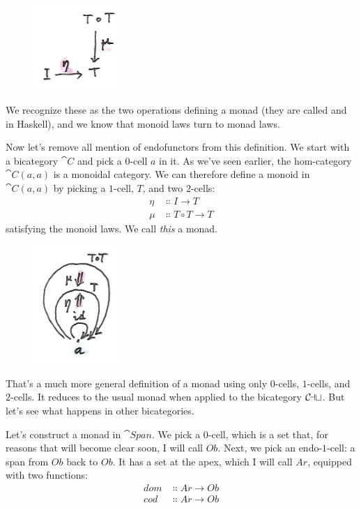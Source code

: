 \begin{figure}[H]
\centering
\includegraphics[width=0.3\textwidth]{images/monad.png}
\end{figure}

\noindent
We recognize these as the two operations defining a monad (they are
called  and  in Haskell), and we know that
monoid laws turn to monad laws.

Now let's remove all mention of endofunctors from this definition. We
start with a bicategory $\cat{C}$ and pick a $0$-cell $a$ in it.
As we've seen earlier, the hom-category $\cat{C}(a, a)$ is a monoidal
category. We can therefore define a monoid in $\cat{C}(a, a)$ by
picking a $1$-cell, $T$, and two $2$-cells:
\begin{align*}
\eta &\Colon I \to T \\
\mu &\Colon T \circ T \to T
\end{align*}
satisfying the monoid laws. We call \emph{this} a monad.

\begin{figure}[H]
\centering
\includegraphics[width=0.3\textwidth]{images/bimonad.png}
\end{figure}

\noindent
That's a much more general definition of a monad using only $0$-cells,
$1$-cells, and $2$-cells. It reduces to the usual monad when applied to the
bicategory $\mathcal{C\mkern-3mu at}$. But let's see what happens in other
bicategories.

Let's construct a monad in $\cat{Span}$. We pick a $0$-cell, which is a
set that, for reasons that will become clear soon, I will call
$Ob$. Next, we pick an endo-$1$-cell: a span from $Ob$ back
to $Ob$. It has a set at the apex, which I will call $Ar$,
equipped with two functions:
\begin{align*}
dom &\Colon Ar \to Ob \\
cod &\Colon Ar \to Ob
\end{align*}

